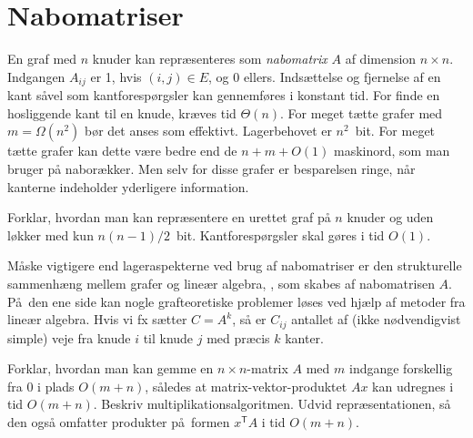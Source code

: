 \section{Nabomatriser}%
%
%
%
%

En graf med $n$ knuder kan repræsenteres som \emph{nabomatrix} $A$ af dimension 
$n\times n$.
Indgangen ${A}_{ij}$ er 1, hvis $(i,j)\in E$, og 0 ellers.
Indsættelse og fjernelse af en kant såvel som kantforespørgsler kan gennemføres i konstant tid.
For finde en hosliggende kant til en knude, kræves tid $\Theta(n)$.
For meget tætte grafer med $m=\Omega(n^2)$ bør det anses som effektivt. 
Lagerbehovet er $n^2$~bit.
For meget tætte grafer kan dette være bedre end de $n + m + O(1)$ maskinord, som man bruger på naborækker.
Men selv for disse grafer er besparelsen ringe, når kanterne indeholder yderligere information.

\begin{exerc}
  Forklar, hvordan man kan repræsentere en urettet graf på $n$ knuder og uden løkker med kun $n(n-1)/2$~bit. 
  Kantforespørgsler skal gøres i tid $O(1)$.
\end{exerc}

Måske vigtigere end lageraspekterne ved brug af nabomatriser er den strukturelle sammenhæng mellem grafer og lineær algebra,
,
som skabes af nabomatrisen $A$.
På den ene side kan nogle grafteoretiske problemer løses ved hjælp af metoder fra lineær algebra.
Hvis vi fx sætter ${C}={A}^k$, så er  ${C}_{ij}$ antallet af (ikke nødvendigvist simple) veje
fra knude $i$ til knude $j$ med præcis $k$ kanter.

\begin{exerc}
  Forklar, hvordan man kan gemme en $n\times n$-matrix ${A}$ med $m$ indgange forskellig fra 0 i plads $O(m+n)$, således at matrix-vektor-produktet ${A}{x}$ kan udregnes i tid $O(m+n)$.
  Beskriv multiplikationsalgoritmen.
  Udvid repræsentationen, så den også omfatter produkter på formen ${x}^{\textsf{T}}{A}$ i tid $O(m+n)$.
\end{exerc}

